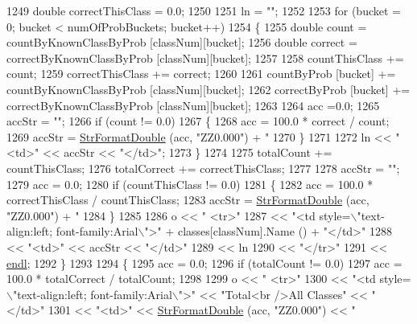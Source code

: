\begin{DoxyCode}
1249     \textcolor{keywordtype}{double}  correctThisClass = 0.0;  
1250 
1251     ln = \textcolor{stringliteral}{""};
1252 
1253     \textcolor{keywordflow}{for}  (bucket = 0;  bucket < numOfProbBuckets;  bucket++)
1254     \{
1255       \textcolor{keywordtype}{double}  count   = countByKnownClassByProb   [classNum][bucket];
1256       \textcolor{keywordtype}{double}  correct = correctByKnownClassByProb [classNum][bucket];
1257 
1258       countThisClass   += count;
1259       correctThisClass += correct;
1260 
1261       countByProb   [bucket] += countByKnownClassByProb   [classNum][bucket];
1262       correctByProb [bucket] += correctByKnownClassByProb [classNum][bucket];
1263 
1264       acc =0.0;
1265       accStr = \textcolor{stringliteral}{""};
1266       \textcolor{keywordflow}{if}  (count != 0.0)
1267       \{
1268         acc = 100.0 * correct / count;
1269         accStr = \hyperlink{namespace_k_k_b_a1a40a40e955fa5417a7cdd990e0021b1}{StrFormatDouble} (acc, \textcolor{stringliteral}{"ZZ0.000"}) + \textcolor{stringliteral}{"%
1270       \}
1271 
1272       ln << \textcolor{stringliteral}{"<td>"} << accStr << \textcolor{stringliteral}{"</td>"};
1273     \}
1274 
1275     totalCount   += countThisClass;
1276     totalCorrect += correctThisClass;
1277 
1278     accStr = \textcolor{stringliteral}{""};
1279     acc = 0.0;
1280     \textcolor{keywordflow}{if}  (countThisClass != 0.0)
1281     \{
1282       acc = 100.0 * correctThisClass / countThisClass;
1283       accStr = \hyperlink{namespace_k_k_b_a1a40a40e955fa5417a7cdd990e0021b1}{StrFormatDouble} (acc, \textcolor{stringliteral}{"ZZ0.000"}) + \textcolor{stringliteral}{"%
1284     \}
1285 
1286     o << \textcolor{stringliteral}{"    <tr>"} 
1287       << \textcolor{stringliteral}{"<td style=\(\backslash\)"text-align:left; font-family:Arial\(\backslash\)">"} + classes[classNum].Name () + \textcolor{stringliteral}{"</td>"} 
1288       << \textcolor{stringliteral}{"<td>"} << accStr  << \textcolor{stringliteral}{"</td>"}
1289       << ln
1290       << \textcolor{stringliteral}{"</tr>"}
1291       << \hyperlink{namespace_k_k_b_ad1f50f65af6adc8fa9e6f62d007818a8}{endl};
1292   \}
1293 
1294   \{
1295     acc = 0.0;
1296     \textcolor{keywordflow}{if}  (totalCount != 0.0)
1297       acc = 100.0 * totalCorrect / totalCount;
1298 
1299     o << \textcolor{stringliteral}{"    <tr>"} 
1300       << \textcolor{stringliteral}{"<td style=\(\backslash\)"text-align:left; font-family:Arial\(\backslash\)">"} << \textcolor{stringliteral}{"Total<br />All Classes"}  << \textcolor{stringliteral}{"</td>"} 
1301       << \textcolor{stringliteral}{"<td>"} << \hyperlink{namespace_k_k_b_a1a40a40e955fa5417a7cdd990e0021b1}{StrFormatDouble} (acc, \textcolor{stringliteral}{"ZZ0.000"}) << \textcolor{stringliteral}{"%
}}}
\end{DoxyCode}
